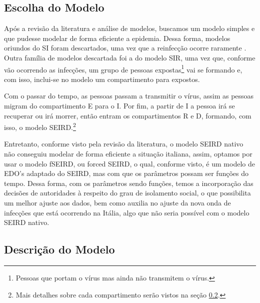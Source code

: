 \documentclass{article}
\begin{document}
	
	\subsection{Escolha do Modelo}
	
	Após a revisão da literatura e análise de modelos, buscamos um modelo simples e que pudesse modelar de forma eficiente a epidemia. Dessa forma, modelos oriundos do SI foram descartados, uma vez que a reinfecção ocorre raramente \cite{again}. Outra família de modelos descartada foi a do modelo SIR, uma vez que, conforme vão ocorrendo as infecções, um grupo de pessoas expostas\footnote{Pessoas que portam o vírus mas ainda não transmitem o vírus.} vai se formando e, com isso, inclui-se no modelo um compartimento para expostos.
	
	Com o passar do tempo, as pessoas passam a transmitir o vírus, assim as pessoas migram do compartimento E para o I. Por fim, a partir de I a pessoa irá se recuperar ou irá morrer, então entram os compartimentos R e D, formando, com isso, o modelo SEIRD.\footnote{Mais detalhes sobre cada compartimento serão vistos na seção \ref{descrição_do_modelo}.}
	
	Entretanto, conforme visto pela revisão da literatura, o modelo SEIRD nativo não conseguiu modelar de forma eficiente a situação italiana, assim, optamos por usar o modelo fSEIRD, ou forced SEIRD, o qual, conforme visto, é um modelo de EDO's adaptado do SEIRD, mas com que os parâmetros possam ser funções do tempo. Dessa forma, com os parâmetros sendo funções, temos a incorporação das decisões de autoridades à respeito do grau de isolamento social, o que possibilita um melhor ajuste aos dados, bem como auxilia no ajuste da nova onda de infecções que está ocorrendo na Itália, algo que não seria possível com o modelo SEIRD nativo.
	
	\subsection{Descrição do Modelo} \label{descrição_do_modelo}
	
\end{document}
